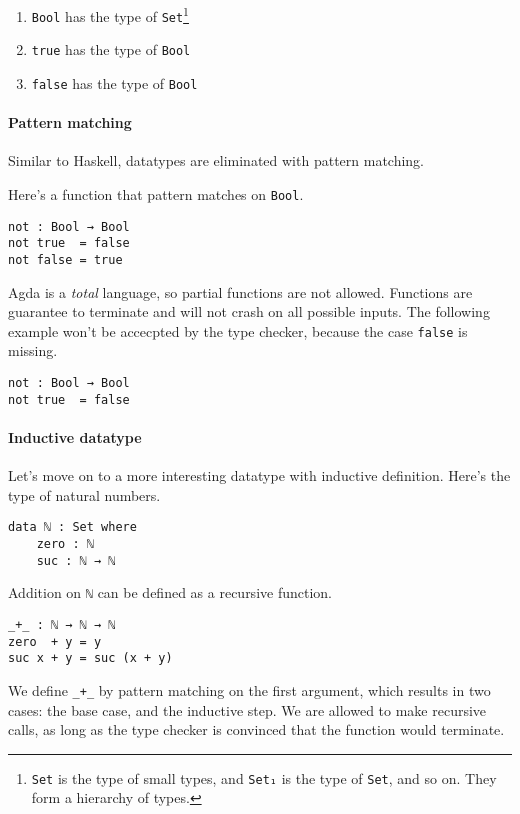 \documentclass[12pt, a4paper]{article}
\begin{document}
\begin{enumerate}
    \item {\lstinline|Bool|} has the type of {\lstinline|Set|}\footnote{{\lstinline|Set|} is the type of small types, and {\lstinline|Set₁|} is the type
of {\lstinline|Set|}, and so on. They form a hierarchy of types.}
    \item {\lstinline|true|} has the type of {\lstinline|Bool|}
    \item {\lstinline|false|} has the type of {\lstinline|Bool|}
\end{enumerate}

\paragraph{Pattern matching}
Similar to Haskell, datatypes are eliminated with pattern matching.

Here's a function that pattern matches on {\lstinline|Bool|}.

\begin{lstlisting}
not : Bool → Bool
not true  = false
not false = true
\end{lstlisting}

Agda is a \textit{total} language, so partial functions are not allowed. Functions
are guarantee to terminate and will not crash on all possible inputs. The following
example won't be accecpted by the type checker, because the case {\lstinline|false|} is missing.

\begin{lstlisting}
not : Bool → Bool
not true  = false
\end{lstlisting}

\paragraph{Inductive datatype} Let's move on to a more interesting datatype with inductive definition. Here's the type of natural numbers.
\begin{lstlisting}
data ℕ : Set where
    zero : ℕ
    suc : ℕ → ℕ
\end{lstlisting}

Addition on {\lstinline|ℕ|} can be defined as a recursive function.

\begin{lstlisting}
_+_ : ℕ → ℕ → ℕ
zero  + y = y
suc x + y = suc (x + y)
\end{lstlisting}

We define {\lstinline|_+_|} by pattern matching on the first argument, which results
in two cases: the base case, and the inductive step. We are allowed to make
recursive calls, as long as the type checker is convinced that the function
would terminate.
\end{document}
